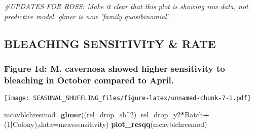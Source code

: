 \documentclass[]{article}
\newenvironment{Shaded}{\begin{snugshade}}{\end{snugshade}}
\newcommand{\CommentTok}[1]{\textcolor[rgb]{0.56,0.35,0.01}{\textit{#1}}}
\newcommand{\DataTypeTok}[1]{\textcolor[rgb]{0.13,0.29,0.53}{#1}}
\newcommand{\DecValTok}[1]{\textcolor[rgb]{0.00,0.00,0.81}{#1}}
\newcommand{\KeywordTok}[1]{\textcolor[rgb]{0.13,0.29,0.53}{\textbf{#1}}}
\newcommand{\NormalTok}[1]{#1}
\newcommand{\OperatorTok}[1]{\textcolor[rgb]{0.81,0.36,0.00}{\textbf{#1}}}
\newcommand{\StringTok}[1]{\textcolor[rgb]{0.31,0.60,0.02}{#1}}
\begin{document}
\begin{Shaded}
\begin{Highlighting}[]
\CommentTok{#UPDATES FOR ROSS: Make it clear that this plot is showing raw data, not predictive model. glmer is now 'family quasibinomial'. }
\end{Highlighting}
\end{Shaded}

\hypertarget{bleaching-sensitivity-rate}{%
\subsection{BLEACHING SENSITIVITY \&
RATE}\label{bleaching-sensitivity-rate}}

\hypertarget{figure-1d-m.-cavernosa-showed-higher-sensitivity-to-bleaching-in-october-compared-to-april.}{%
\subsubsection{Figure 1d: M. cavernosa showed higher sensitivity to
bleaching in October compared to
April.}\label{figure-1d-m.-cavernosa-showed-higher-sensitivity-to-bleaching-in-october-compared-to-april.}}

\begin{Shaded}
\end{Shaded}

\texttt{[image: SEASONAL\_SHUFFLING\_files/figure-latex/unnamed-chunk-7-1.pdf]}

\begin{Shaded}
\begin{Highlighting}[]
\NormalTok{mcavblchresmod=}\KeywordTok{glmer}\NormalTok{((rel_drop_sh}\OperatorTok{^}\DecValTok{2}\NormalTok{)}\OperatorTok{~}\NormalTok{rel_drop_y2}\OperatorTok{*}\NormalTok{Batch}\OperatorTok{+}\NormalTok{(}\DecValTok{1}\OperatorTok{|}\NormalTok{Colony),}\DataTypeTok{data=}\NormalTok{mcavsensitivity)}
\KeywordTok{plot_resqq}\NormalTok{(mcavblchresmod)}
\end{Highlighting}
\end{Shaded}
\end{document}
